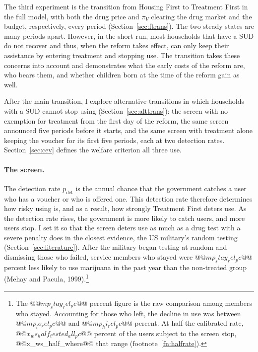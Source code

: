 \documentclass[10pt]{article}
\begin{document}
The third experiment is the transition from Housing First to Treatment First in the full model, with both the drug price and $\pi_V$ clearing the drug market and the budget, respectively, every period (Section~\ref{sec:ftrans}).   The two steady states are many periods apart. However, in the short run, most households that have a SUD do not recover and thus, when the reform takes effect, can only keep their assistance by entering treatment and stopping use. The transition takes these concerns into account and demonstrates what the early costs of the reform are, who bears them, and whether children born at the time of the reform gain as well.

After the main transition, I explore alternative transitions in which households with a SUD cannot stop using (Section~\ref{sec:alttrans}): the screen with no exemption for treatment from the first day of the reform, the same screen announced five periods before it starts, and the same screen with treatment alone keeping the voucher for its first five periods, each at two detection rates. Section~\ref{sec:cev} defines the welfare criterion all three use.

\paragraph{The screen.}    The detection rate $p_{\mathrm{det}}$ is the annual chance that the government catches a user who has a voucher or who is offered one. This detection rate therefore determines how risky using is, and as a result, how strongly Treatment First deters use. As the detection rate rises, the government is more likely to catch users, and more users stop. I  set it so that the screen deters use as much as a drug test with a severe penalty does in the closest evidence, the US military's random testing (Section~\ref{sec:literature}).  After the military began testing at random and dismissing those who failed, service members who stayed were $@@mp_stay_rel_pc@@$ percent less likely to use marijuana in the past year than the non-treated group (Mehay and Pacula, 1999).\footnote{  The $@@mp_stay_rel_pc@@$ percent figure is the raw comparison among members who stayed. Accounting for those who left, the decline in use was between $@@mp_lo_rel_pc@@$ and $@@mp_hi_rel_pc@@$ percent. At half the calibrated rate, $@@x_ws_half_tested_all_pc@@$ percent of the users subject to the screen stop, @@x_ws_half_where@@ that range (footnote~\ref{fn:halfrate}).}
\end{document}
